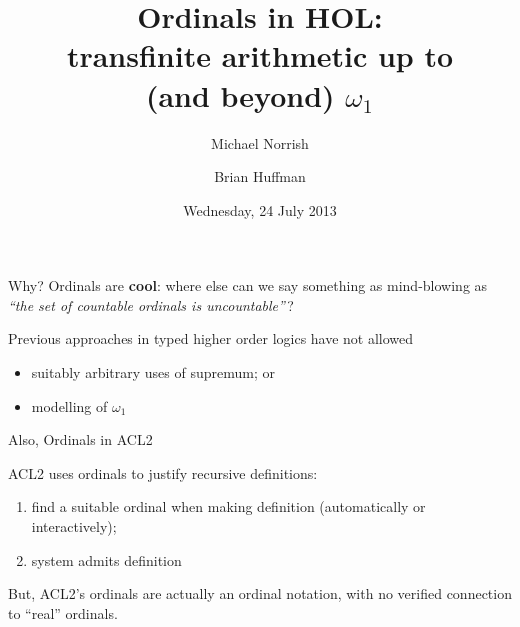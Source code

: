 \documentclass[xetex,14pt]{beamer}
\title{Ordinals in HOL:
\\transfinite arithmetic up to\\
(and beyond) $\omega_1$}
\author{Michael Norrish \and Brian Huffman}
\date{Wednesday, 24 July 2013}
\begin{document}
\begin{frame}
\maketitle
\end{frame}

\begin{frame}{Why?}
Ordinals are \textbf{cool}: where else can we say something as mind-blowing as \emph{“the set of countable ordinals is uncountable”}\,?

\bigskip
Previous approaches in typed higher order logics have not allowed
\begin{itemize}
\item suitably arbitrary uses of supremum; or
\item modelling of $\omega_1$
\end{itemize}
\end{frame}

\begin{frame}{Also, Ordinals in ACL2}

ACL2 uses ordinals to justify recursive definitions:
\begin{enumerate}
\item find a suitable ordinal when making definition (automatically or interactively);
\item system admits definition
\end{enumerate}

\bigskip But, ACL2’s ordinals are actually an ordinal notation, with no verified connection to “real” ordinals.
\end{frame}
\end{document}
